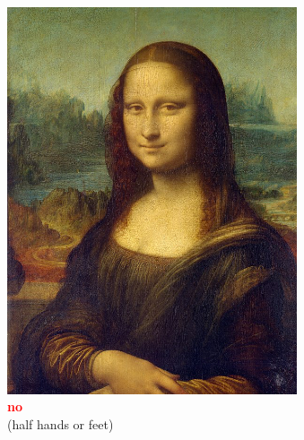 \documentclass[hyperref={pdfpagelabels=false},aspectratio=169]{beamer}
\begin{document}
\begin{frame}				%
	\begin{columns}[T,onlytextwidth]
	\begin{figure} 
		\centering
		\def\svgwidth{1\textwidth}
\includegraphics[width=1\textwidth]{haende_ab.jpg} \\
		\textcolor{red}{\textbf{no}}	\\(half hands or feet)
	\end{figure}
	\begin{figure} 
		\centering
		\def\svgwidth{1\textwidth}

\end{figure}
\end{columns}
\end{frame}
\end{document}
